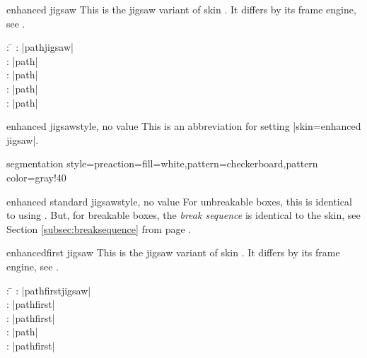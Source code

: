 \clearpage

\begin{docSkin}{enhanced jigsaw}
  This is the jigsaw variant of skin .
  It differs by its frame engine, see .
\begin{tcolorbox}[skintable=enhanced jigsaw]
  \begin{tabbing}
    : \=\kill
    :           \> |pathjigsaw|\\
    : \> |path|\\ 
    :        \> |path|\\
    :    \> |path|\\
    :           \> |path|
  \end{tabbing}
\end{tcolorbox}
\end{docSkin}

\begin{docTcbKey}{enhanced jigsaw}{}{style, no value}
  This is an abbreviation for setting |skin=enhanced jigsaw|.
\end{docTcbKey}


\begin{dispExample*}{segmentation style={preaction={fill=white},pattern=checkerboard,pattern color=gray!40}}
\end{dispExample*}


\begin{docTcbKey}[][doc new=2017-07-01]{enhanced standard jigsaw}{}{style, no value}
  For unbreakable boxes, this is identical to using .
  But, for breakable boxes, the \emph{break sequence} is identical to the  skin,
  see Section \ref{subsec:breaksequence} from page \pageref{subsec:breaksequence}.
\end{docTcbKey}


\clearpage
\begin{docSkin}{enhancedfirst jigsaw}
  This is the jigsaw variant of skin .
  It differs by its frame engine, see .
\begin{tcolorbox}[skintable=enhancedfirst jigsaw]
  \begin{tabbing}
    : \=\kill
    :           \> |pathfirstjigsaw|\\
    : \> |pathfirst|\\ 
    :        \> |pathfirst|\\
    :    \> |path|\\
    :           \> |pathfirst|
  \end{tabbing}
\end{tcolorbox}
\end{docSkin}


